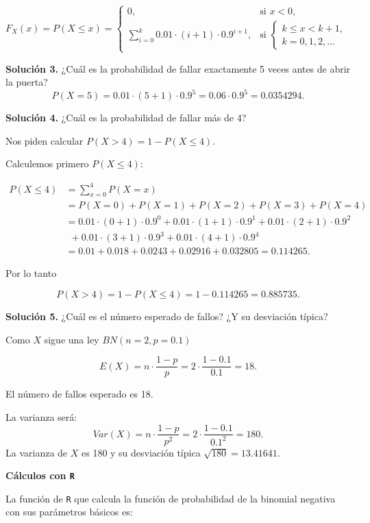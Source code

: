 \documentclass[
  letterpaper,
  DIV=11,
  numbers=noendperiod]{scrreprt}
\begin{document}
\[
F_X(x)=P(X\leq x)=
\left\{
\begin{array}{ll}
0, & \mbox{si } x<0, \\
\displaystyle\sum_{i=0}^{k }0.01\cdot (i+1) \cdot 0.9^{i+1},
& \mbox{si }\left\{\begin{array}{l} k\leq x< k+1,\\k=0,1,2,\ldots\end{array}\right. 
\end{array}
\right.
\]

\textbf{Solución 3.} ¿Cuál es la probabilidad de fallar exactamente 5
veces antes de abrir la puerta? \[
P(X=5)= 0.01\cdot (5+1) \cdot 0.9^{5}= 0.06 \cdot 0.9^{5}= 0.0354294.
\]

\textbf{Solución 4.} ¿Cuál es la probabilidad de fallar más de 4?

Nos piden calcular \(P(X>4)=1-P(X\leq 4).\)

Calculemos primero \(P(X\leq 4):\)

\[
\begin{array}{rl}
P(X\leq 4) &=  \displaystyle\sum_{x=0}^{4} P(X=x) \\ & =P(X=0)+P(X=1)+P(X=2)+P(X=3)+P(X=4)\\
&= 0.01\cdot (0+1) \cdot 0.9^{0}+0.01\cdot (1+1) \cdot 0.9^{1}+0.01\cdot (2+1) \cdot 0.9^{2} \\ &\ \ 
+0.01\cdot (3+1) \cdot 0.9^{3} + 0.01\cdot (4+1) \cdot 0.9^{4} \\ & =
0.01 +0.018+0.0243+0.02916+0.032805 = 0.114265.
\end{array}
\]

Por lo tanto

\[
P(X>4)=1-P(X\leq 4)=1-0.114265=
0.885735.
\]

\textbf{Solución 5.} ¿Cuál es el número esperado de fallos? ¿Y su
desviación típica?

Como \(X\) sigue una ley \(BN(n=2,p=0.1)\)

\[E(X)=n\cdot \frac{1-p}{p}=2\cdot \frac{1-0.1}{0.1}=18.\]

El número de fallos esperado es 18.

La varianza será: \[
Var(X)=n\cdot\frac{1-p}{p^2}=2 \cdot \frac{1-0.1}{0.1^2}=180.
\] La varianza de \(X\) es 180 y su desviación típica
\(\sqrt{180}=13.41641.\)

\textbf{Cálculos con \texttt{R}}

La función de \texttt{R} que calcula la función de probabilidad de la
binomial negativa con sus parámetros básicos es:
\end{document}
